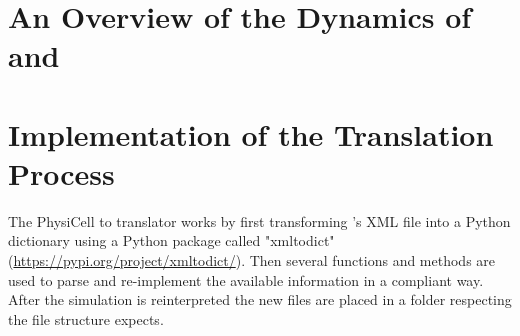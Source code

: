 \begin{table}[H]%
\centering
{}
\caption{Comparison of selected concepts from CompuCell3D and PhysiCell}
\label{tab:trans:cc3d-psc-diffs}
\end{table}

\section{An Overview of the Dynamics of \ccds and \psc}

\section{Implementation of the Translation Process}\label{sec:trans:impl}

The PhysiCell to \ccds translator works by first transforming \psc's XML file into a Python dictionary using a Python package called "xmltodict" (\url{https://pypi.org/project/xmltodict/}). Then several functions and methods are used to parse and re-implement the available 
information in a \ccds compliant way.  After the simulation is reinterpreted the new \ccds files are placed in a folder respecting the file structure \ccds expects.

